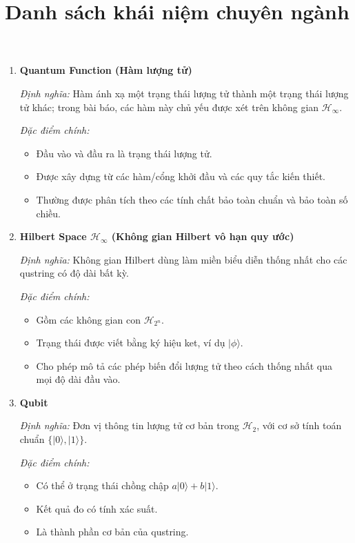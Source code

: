 \documentclass[12pt,a4paper]{article}
\title{Danh sách khái niệm chuyên ngành}
\author{}
\date{}
\begin{document}
\maketitle
\fontsize{12pt}{18pt}\selectfont

\vspace{0.5em}
\begin{enumerate}[leftmargin=*,itemsep=0.8em]
\item \textbf{Quantum Function (Hàm lượng tử)}

\textit{Định nghĩa:} Hàm ánh xạ một trạng thái lượng tử thành một trạng thái lượng tử khác; trong bài báo, các hàm này chủ yếu được xét trên không gian $\mathcal{H}_{\infty}$.

\textit{Đặc điểm chính:}
\begin{itemize}[leftmargin=1.5em]
\item Đầu vào và đầu ra là trạng thái lượng tử.
\item Được xây dựng từ các hàm/cổng khởi đầu và các quy tắc kiến thiết.
\item Thường được phân tích theo các tính chất bảo toàn chuẩn và bảo toàn số chiều.
\end{itemize}

\item \textbf{Hilbert Space $\mathcal{H}_{\infty}$ (Không gian Hilbert vô hạn quy ước)}

\textit{Định nghĩa:} Không gian Hilbert dùng làm miền biểu diễn thống nhất cho các qustring có độ dài bất kỳ.

\textit{Đặc điểm chính:}
\begin{itemize}[leftmargin=1.5em]
\item Gồm các không gian con $\mathcal{H}_{2^n}$.
\item Trạng thái được viết bằng ký hiệu ket, ví dụ $|\phi\rangle$.
\item Cho phép mô tả các phép biến đổi lượng tử theo cách thống nhất qua mọi độ dài đầu vào.
\end{itemize}

\item \textbf{Qubit}

\textit{Định nghĩa:} Đơn vị thông tin lượng tử cơ bản trong $\mathcal{H}_2$, với cơ sở tính toán chuẩn $\{|0\rangle,|1\rangle\}$.

\textit{Đặc điểm chính:}
\begin{itemize}[leftmargin=1.5em]
\item Có thể ở trạng thái chồng chập $a|0\rangle+b|1\rangle$.
\item Kết quả đo có tính xác suất.
\item Là thành phần cơ bản của qustring.
\end{itemize}


\end{enumerate}
\end{document}
